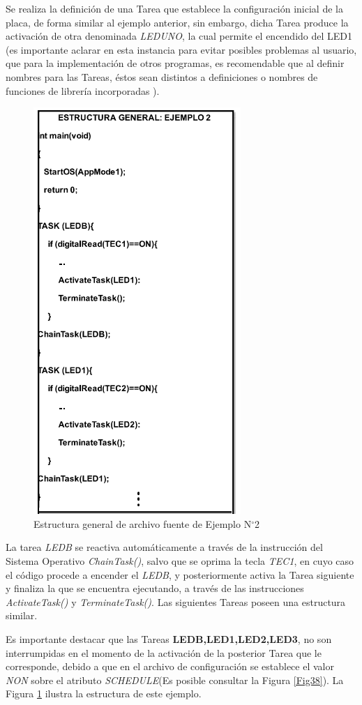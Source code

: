 \documentclass[12pt,letterpaper]{article}
\begin{document}
Se realiza la definición de una Tarea que establece la configuración inicial de la placa, de forma similar al ejemplo anterior, sin embargo, dicha Tarea produce la activación de otra denominada \textit{LEDUNO}, la cual permite el encendido del LED1 (es importante aclarar en esta instancia para evitar posibles problemas al usuario, que para la implementación de otros programas, es recomendable que al definir nombres para las Tareas, éstos sean distintos a definiciones o nombres de funciones de librería incorporadas ).
\begin{figure}[!h]
\centering
\includegraphics[width=5 cm]{figuras/f23.png}
\caption{Estructura general de archivo fuente de Ejemplo N$^{\circ}$2}
\label{Fig40}
\end{figure}
La tarea \textit{LEDB} se reactiva automáticamente a través de la instrucción del Sistema Operativo \textit{ChainTask()}, salvo que se oprima la tecla \textit{TEC1}, en cuyo caso el código procede a encender el \textit{LEDB}, y posteriormente activa la Tarea siguiente y finaliza la que se encuentra ejecutando, a través de las instrucciones \textit{ActivateTask()} y \textit{TerminateTask()}. Las siguientes Tareas poseen una estructura similar.

Es importante destacar que las Tareas \textbf{LEDB,LED1,LED2,LED3}, no son interrumpidas  en el momento de la activación de la posterior Tarea que le corresponde, debido a que en el archivo de configuración se establece el valor \textit{NON} sobre el atributo \textit{SCHEDULE}(Es posible consultar la Figura \ref{Fig38}). La Figura \ref{Fig40} ilustra la estructura de este ejemplo.
\end{document}
